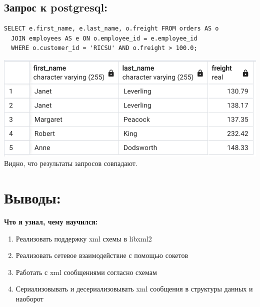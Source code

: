 \documentclass[12pt,onecolumn]{article}
\begin{document}
\subsection{Запрос к postgresql:}
\begin{lstlisting}[style=bash]
  SELECT e.first_name, e.last_name, o.freight FROM orders AS o
  JOIN employees AS e ON o.employee_id = e.employee_id
  WHERE o.customer_id = 'RICSU' AND o.freight > 100.0;
\end{lstlisting}
\includegraphics{image/pg1.png}\\
Видно, что результаты запросов совпадают.

\section{Выводы:}

\textbf{Что я узнал, чему научился:}
\begin{enumerate}
    \item Реализовать поддержку xml схемы в libxml2
    \item Реализовать сетевое взаимодействие с помощью сокетов
    \item Работать с xml сообщениями согласно схемам
    \item Сериализовывать и десериализовывать xml сообщения в структуры данных и наоборот
\end{enumerate}
\end{document}
